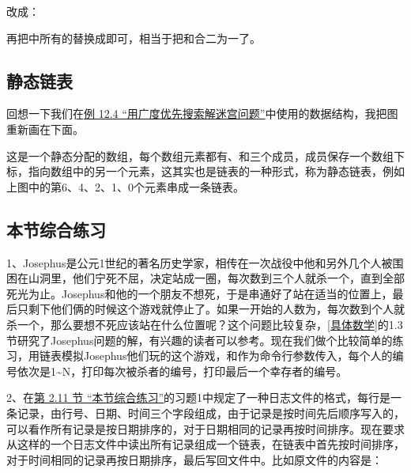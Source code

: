 

改成：




再把中所有的替换成即可，相当于把和合二为一了。



\subsection{静态链表}
%


回想一下我们在\hyperlink{db.ch12s04.id2750660}{例 12.\BookSplit{}4 “用广度优先搜索解迷宫问题”}中使用的数据结构，我把图重新画在下面。




这是一个静态分配的数组，每个数组元素都有、和三个成员，成员保存一个数组下标，指向数组中的另一个元素，这其实也是链表的一种形式，称为静态链表，例如上图中的第6、4、2、1、0个元素串成一条链表。


\subsection{本节综合练习}
%


1、Josephus是公元1世纪的著名历史学家，相传在一次战役中他和另外几个人被围困在山洞里，他们宁死不屈，决定站成一圈，每次数到三个人就杀一个，直到全部死光为止。Josephus和他的一个朋友不想死，于是串通好了站在适当的位置上，最后只剩下他们俩的时候这个游戏就停止了。如果一开始的人数为，每次数到个人就杀一个，那么要想不死应该站在什么位置呢？这个问题比较复杂，\hyperlink{db.bi01.bibli.concrete}{[具体数学]}的1.\BookSplit{}3节研究了Josephus问题的解，有兴趣的读者可以参考。现在我们做个比较简单的练习，用链表模拟Josephus他们玩的这个游戏，和作为命令行参数传入，每个人的编号依次是1\textasciitilde{}\BookSplit{}N，打印每次被杀者的编号，打印最后一个幸存者的编号。



2、在\hyperlink{db.ch25s02.id2834904}{第 2.\BookSplit{}11 节 “本节综合练习”}的习题1中规定了一种日志文件的格式，每行是一条记录，由行号、日期、时间三个字段组成，由于记录是按时间先后顺序写入的，可以看作所有记录是按日期排序的，对于日期相同的记录再按时间排序。现在要求从这样的一个日志文件中读出所有记录组成一个链表，在链表中首先按时间排序，对于时间相同的记录再按日期排序，最后写回文件中。比如原文件的内容是：


